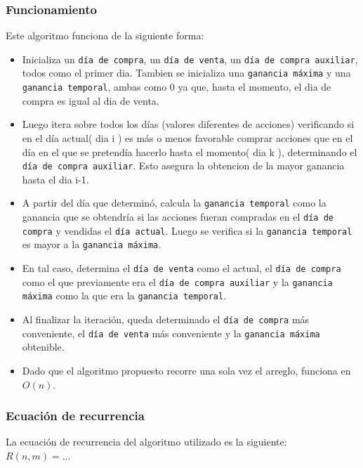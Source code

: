 \documentclass[a4paper, 10pt]{article}
\def\code#1{\texttt{#1}}
\newcommand\tab[1][0.5cm]{\hspace*{#1}}
\begin{document}
\subsubsection{Funcionamiento}
\tab Este algoritmo funciona de la siguiente forma:
\begin{itemize}
 \item Inicializa un \code{día de compra}, un \code{día de venta}, un \code{día de compra auxiliar}, todos
       como el primer dia. Tambien se inicializa una \code{ganancia máxima} y una \code{ganancia temporal},
       ambas como 0 ya que, hasta el momento, el dia de compra es igual al dia de venta.

 \item Luego itera sobre todos los días (valores diferentes de acciones) verificando si
       en el día actual( dia i ) es más o menos favorable comprar acciones que en el día en el
       que se pretendía hacerlo hasta el momento( dia k ), determinando el \code{día de compra auxiliar}.
       Esto asegura la obtencion de la mayor ganancia hasta el dia i-1.

 \item A partir del día que determinó, calcula la \code{ganancia temporal} como la ganancia que se obtendría
       si las acciones fueran compradas en el \code{día de compra} y vendidas el \code{día actual}.
       Luego se verifica si la \code{ganancia temporal} es mayor a la \code{ganancia máxima}.

 \item En tal caso, determina el \code{día de venta} como el actual, el \code{día de compra}
       como el que previamente era el \code{día de compra auxiliar} y la \code{ganancia máxima} como
       la que era la \code{ganancia temporal}.

 \item Al finalizar la iteración, queda determinado el \code{día de compra} más conveniente, el
       \code{día de venta} más conveniente y la \code{ganancia máxima} obtenible.

 \item Dado que el algoritmo propuesto recorre una sola vez el arreglo, funciona en $O(n)$.
\end{itemize}
\subsubsection{Ecuación de recurrencia}
\tab La ecuación de recurrencia del algoritmo utilizado es la siguiente: \\
\tab\tab\tab $ R(n, m) = ... $ %
\newpage
\end{document}
